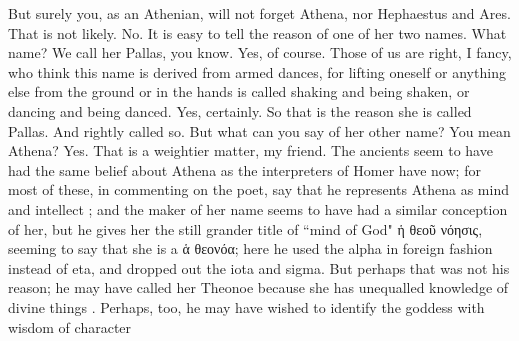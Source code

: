 {{\hermogenesspeaks
But surely you, as an Athenian, will not forget Athena, nor Hephaestus and Ares.
\socratesspeaks
That is not likely.
\hermogenesspeaks
No.
\socratesspeaks
It is easy to tell the reason of one of her two names.
\hermogenesspeaks
What name?
\socratesspeaks
We call her Pallas, you know.
\hermogenesspeaks
Yes, of course.
\socratesspeaks
Those of us are right, I fancy,  who think this name is derived from armed dances, for lifting oneself or anything else from the ground or  in the hands is called shaking  and being shaken, or dancing and being danced.
\hermogenesspeaks
Yes, certainly.
\socratesspeaks
So that is the reason she is called Pallas.
\hermogenesspeaks
And rightly called so. But what can you say of her other name?
\socratesspeaks
You mean Athena?
\hermogenesspeaks
Yes.
\socratesspeaks
That is a weightier matter, my friend. The ancients seem to have had the same belief about Athena as the interpreters of Homer have now;  for most of these, in commenting on the poet, say that he represents Athena as mind  and intellect ; and the maker of her name seems to have had a similar conception of her, but he gives her the still grander title of ``mind of God" ἡ θεοῦ νόησις, seeming to say that she is a ἁ θεονόα; here he used the alpha in foreign fashion instead of eta, and dropped out the iota and sigma. But perhaps that was not his reason; he may have called her Theonoe because she has unequalled knowledge of divine things . Perhaps, too, he may have wished to identify the goddess with wisdom of character }}
